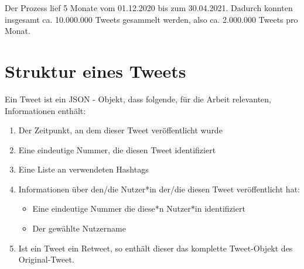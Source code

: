 Der Prozess lief 5 Monate vom 01.12.2020 bis zum 30.04.2021. 
Dadurch konnten insgesamt ca. 10.000.000 Tweets gesammelt werden, also ca. 2.000.000 Tweets pro Monat.

\section{Struktur eines Tweets}
\label{sec:struktur-eines-tweets}
Ein Tweet ist ein \ac{JSON} - Objekt, dass folgende, für die Arbeit relevanten, Informationen enthält:
\begin{enumerate}
	\item Der Zeitpunkt, an dem dieser Tweet veröffentlicht wurde
	\item Eine eindeutige Nummer, die diesen Tweet identifiziert
	\item Eine Liste an verwendeten \glspl{Hashtag}
	\item Informationen über den/die Nutzer*in der/die diesen Tweet veröffentlicht hat: 
	\begin{itemize}
		\item Eine eindeutige Nummer die diese*n Nutzer*in identifiziert
		\item Der gewählte Nutzername
	\end{itemize}
	\item Ist ein Tweet ein \gls{Retweet}, so enthält dieser das komplette Tweet-Objekt des Original-Tweet.
\end{enumerate}



 
